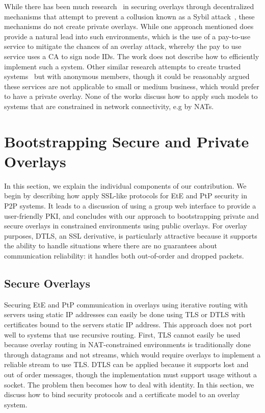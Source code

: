 \documentclass[conference]{IEEEtran}
\begin{document}
While there has been much research~\cite{secure_routing} in securing overlays
through decentralized mechanisms that attempt to prevent a collusion known as
a Sybil attack~\cite{sybil}, these mechanisms do not create private overlays.
While one approach mentioned does provide a natural lead into such
environments, which is the use of a pay-to-use service to mitigate the chances
of an overlay attack, whereby the pay to use service uses a CA to sign node
IDs.  The work does not describe how to efficiently implement such a system.
Other similar research attempts to create trusted systems~\cite{stone, tor} but
with anonymous members, though it could be reasonably argued these services are
not applicable to small or medium business, which would prefer to have a private
overlay.  None of the works discuss how to apply such models to
systems that are constrained in network connectivity, e.g by NATs.

\section{Bootstrapping Secure and Private Overlays}
\label{contributions}
In this section, we explain the individual components of our contribution.  We
begin by describing how apply SSL-like protocols for EtE and PtP security in
P2P systems. It leads to a discussion of using a group web interface to
provide a user-friendly PKI, and concludes with our approach to bootstrapping
private and secure overlays in constrained environments using public overlays.
For overlay purposes, DTLS, an SSL derivative, is particularly attractive
because it supports the ability to handle situations where there are no
guarantees about communication reliability: it handles both out-of-order and
dropped packets.


\subsection{Secure Overlays}
\label{secure_overlays}
Securing EtE and PtP communication in overlays using iterative routing with
servers using static IP addresses can easily be done using TLS or DTLS with
certificates bound to the servers static IP address.  This approach does not
port well to systems that use recursive routing. First, TLS cannot easily be used
because overlay routing in NAT-constrained environments is traditionally done through datagrams and not streams,
which would require overlays to implement a reliable stream to use TLS. 
DTLS can be applied because it supports lost and out of order messages, though
the implementation must support usage without a socket.  The
problem then becomes how to deal with identity.  In this section, we discuss how
to bind security protocols and a certificate model to an overlay system.
\end{document}
